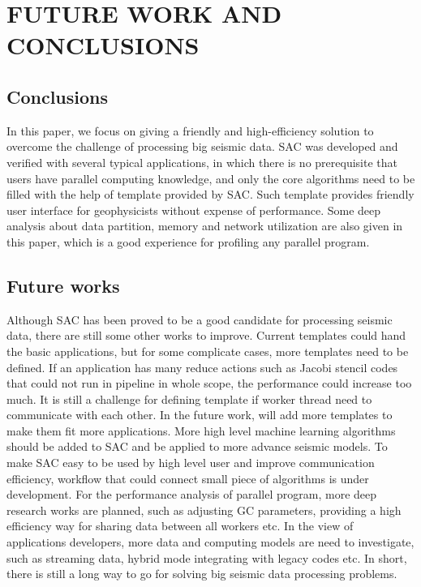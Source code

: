 %
%
%



\chapter{\uppercase{Future Work and Conclusions}}

\section{Conclusions}

In this paper, we focus on giving a friendly and high-efficiency solution to overcome the challenge of processing big seismic data. SAC was developed and verified with several typical applications, in which there is no prerequisite that users have parallel computing knowledge, and only the core algorithms need to be filled with the help of template provided by SAC. Such template provides friendly user interface for geophysicists without expense of performance. Some deep analysis about data partition, memory and network utilization are also given in this paper, which is a good experience for profiling any parallel program. 

\section{Future works}

Although SAC has been proved to be a good candidate for processing seismic data, there are still some other works to improve. Current templates could hand the basic applications, but for some complicate cases, more templates need to be defined. If an application has many reduce actions such as Jacobi stencil codes that could not run in pipeline in whole scope, the performance could increase too much. It is still a challenge for defining template if worker thread need to communicate with each other. In the future work, will add more templates to make them fit more applications. More high level machine learning algorithms should be added to SAC and be applied to more advance seismic models. To make SAC easy to be used by high level user and improve communication efficiency, workflow that could connect small piece of algorithms is under development. For the performance analysis of parallel program, more deep research works are planned, such as adjusting GC parameters, providing a high efficiency way for sharing data between all workers etc. In the view of applications developers, more data and computing models are need to investigate, such as streaming data, hybrid mode integrating with legacy codes etc. In short, there is still a long way to go for solving big seismic data processing problems.   


